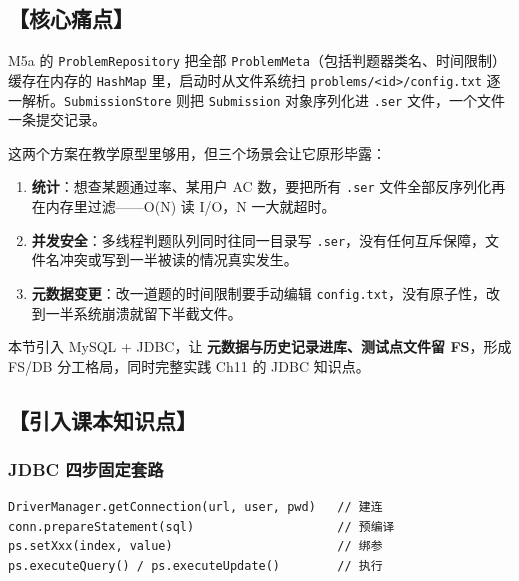 \documentclass[
  11pt,
]{ctexart}
\providecommand{\tightlist}{%
  \setlength{\itemsep}{0pt}\setlength{\parskip}{0pt}}
\begin{document}
\hypertarget{ux6838ux5fc3ux75dbux70b9-2}{%
\subsection{【核心痛点】}\label{ux6838ux5fc3ux75dbux70b9-2}}

M5a 的 \texttt{ProblemRepository} 把全部
\texttt{ProblemMeta}（包括判题器类名、时间限制）缓存在内存的
\texttt{HashMap} 里，启动时从文件系统扫
\texttt{problems/\textless{}id\textgreater{}/config.txt}
逐一解析。\texttt{SubmissionStore} 则把 \texttt{Submission} 对象序列化进
\texttt{.ser} 文件，一个文件一条提交记录。

这两个方案在教学原型里够用，但三个场景会让它原形毕露：

\begin{enumerate}
\def\labelenumi{\arabic{enumi}.}
\tightlist
\item
  \textbf{统计}：想查某题通过率、某用户 AC 数，要把所有 \texttt{.ser}
  文件全部反序列化再在内存里过滤------O(N) 读 I/O，N 一大就超时。
\item
  \textbf{并发安全}：多线程判题队列同时往同一目录写
  \texttt{.ser}，没有任何互斥保障，文件名冲突或写到一半被读的情况真实发生。
\item
  \textbf{元数据变更}：改一道题的时间限制要手动编辑
  \texttt{config.txt}，没有原子性，改到一半系统崩溃就留下半截文件。
\end{enumerate}

本节引入 MySQL + JDBC，让 \textbf{元数据与历史记录进库、测试点文件留
FS}，形成 FS/DB 分工格局，同时完整实践 Ch11 的 JDBC 知识点。

\hypertarget{ux5f15ux5165ux8bfeux672cux77e5ux8bc6ux70b9-2}{%
\subsection{【引入课本知识点】}\label{ux5f15ux5165ux8bfeux672cux77e5ux8bc6ux70b9-2}}

\hypertarget{jdbc-ux56dbux6b65ux56faux5b9aux5957ux8def}{%
\subsubsection{JDBC
四步固定套路}\label{jdbc-ux56dbux6b65ux56faux5b9aux5957ux8def}}

\begin{verbatim}
DriverManager.getConnection(url, user, pwd)   // 建连
conn.prepareStatement(sql)                    // 预编译
ps.setXxx(index, value)                       // 绑参
ps.executeQuery() / ps.executeUpdate()        // 执行
\end{verbatim}
\end{document}
